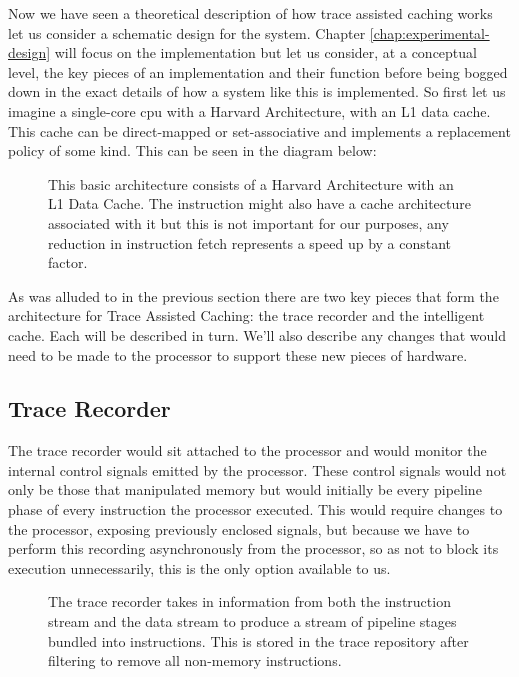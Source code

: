 Now we have seen a theoretical description of how trace assisted caching works let us consider a schematic design for the system. Chapter \ref{chap:experimental-design} will focus on the implementation but let us consider, at a conceptual level, the key pieces of an implementation and their function before being bogged down in the exact details of how a system like this is implemented. So first let us imagine a single-core \gls{cpu} with a Harvard Architecture, with an L1 data cache. This cache can be direct-mapped or set-associative and implements a replacement policy of some kind. This can be seen in the diagram below:

\begin{figure}
	
	\caption{This basic architecture consists of a Harvard Architecture with an L1 Data Cache. The instruction might also have a cache architecture associated with it but this is not important for our purposes, any reduction in instruction fetch represents a speed up by a constant factor.}
\end{figure}

As was alluded to in the previous section there are two key pieces that form the architecture for Trace Assisted Caching: the trace recorder and the intelligent cache. Each will be described in turn. We'll also describe any changes that would need to be made to the processor to support these new pieces of hardware.

\subsection{Trace Recorder}

The trace recorder would sit attached to the processor and would monitor the internal control signals emitted by the processor. These control signals would not only be those that manipulated memory but would initially be every pipeline phase of every instruction the processor executed. This would require changes to the processor, exposing previously enclosed signals, but because we have to perform this recording asynchronously from the processor, so as not to block its execution unnecessarily, this is the only option available to us.

\begin{figure}
	
	\caption{The trace recorder takes in information from both the instruction stream and the data stream to produce a stream of pipeline stages bundled into instructions. This is stored in the trace repository after filtering to remove all non-memory instructions.}
\end{figure}

